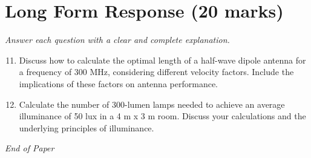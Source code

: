 \documentclass[12pt]{article}
\begin{document}
\section*{Long Form Response (20 marks)}
\textit{Answer each question with a clear and complete explanation.}
\begin{enumerate}[label=\arabic*.]
\setcounter{enumi}{10}
\item Discuss how to calculate the optimal length of a half-wave dipole antenna for a frequency of 300 MHz, considering different velocity factors. Include the implications of these factors on antenna performance.
\item Calculate the number of 300-lumen lamps needed to achieve an average illuminance of 50 lux in a 4 m x 3 m room. Discuss your calculations and the underlying principles of illuminance.
\end{enumerate}

\vfill
\noindent\textit{End of Paper}
\end{document}
